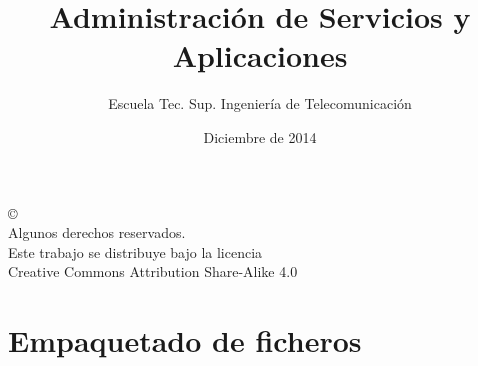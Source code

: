 \documentclass[ucs]{beamer}
\begin{document}
\title[Administración de Servicios y Aplicaciones]{Administración de Servicios y Aplicaciones}
\author[GSyC]{Escuela Tec. Sup. Ingeniería de Telecomunicación}
\date[2014]{Diciembre de 2014}


\begin{frame}
  \titlepage
\end{frame}



\begin{frame}[b]
\begin{flushright}
{\tiny
\copyright \insertshortdate~\insertshortauthor \\
  Algunos derechos reservados. \\
  Este trabajo se distribuye bajo la licencia \\
  Creative Commons Attribution Share-Alike 4.0\\
}
\end{flushright}  
\end{frame}








\section{Empaquetado de ficheros}
\end{document}
